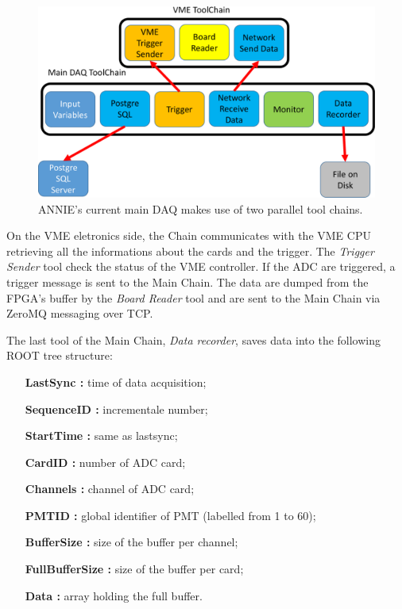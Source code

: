 \begin{figure}[]
  \centering
  \includegraphics[scale=0.20]{pics/pag2richardshkmeeting}
  \caption{ANNIE's current main DAQ makes use of two parallel tool chains.}
  \label{fig:anniedaq}
\end{figure}

On the VME eletronics side, the Chain communicates with the VME CPU retrieving all the informations %
about the cards and the trigger.
The \emph{Trigger Sender} tool check the status of the VME controller.
If the ADC are triggered, a trigger message is sent to the Main Chain.
The data are dumped from the FPGA's buffer by the \emph{Board Reader} tool and %
are sent to the Main Chain via ZeroMQ messaging over TCP.

The last tool of the Main Chain, \emph{Data recorder}, saves data into the following %
ROOT tree structure:
\begin{center}
\begin{varwidth}{\textwidth}
\begin{itemize}
  \item[\bfseries LastSync :] time of data acquisition;
  \item[\bfseries SequenceID :] incrementale number;
  \item[\bfseries StartTime :] same as lastsync;
  \item[\bfseries CardID :] number of ADC card;
  \item[\bfseries Channels :] channel of ADC card;
  \item[\bfseries PMTID :] global identifier of PMT (labelled from 1 to 60);
  \item[\bfseries BufferSize :] size of the buffer per channel;
  \item[\bfseries FullBufferSize :] size of the buffer per card;
  \item[\bfseries Data :] array holding the full buffer.
\end{itemize}
\end{varwidth}
\end{center}

